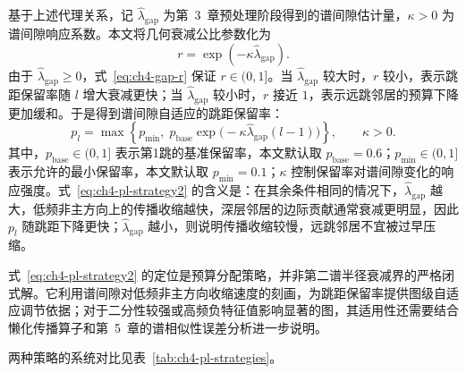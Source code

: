 基于上述代理关系，记 \(\hat{\lambda}_{\mathrm{gap}}\) 为第~3~章预处理阶段得到的谱间隙估计量，\(\kappa>0\) 为谱间隙响应系数。本文将几何衰减公比参数化为
\begin{equation}
  r=\exp(-\kappa\hat{\lambda}_{\mathrm{gap}}).
  \label{eq:ch4-gap-r}
\end{equation}
由于 \(\hat{\lambda}_{\mathrm{gap}}\geq 0\)，式~\eqref{eq:ch4-gap-r} 保证 \(r\in(0,1]\)。当 \(\hat{\lambda}_{\mathrm{gap}}\) 较大时，\(r\) 较小，表示跳距保留率随 \(l\) 增大衰减更快；当 \(\hat{\lambda}_{\mathrm{gap}}\) 较小时，\(r\) 接近 \(1\)，表示远跳邻居的预算下降更加缓和。于是得到谱间隙自适应的跳距保留率：
\begin{equation}
  p_l = \max\!\left\{p_{\min},\;
  p_{\text{base}} \exp\!\bigl(-\kappa \hat{\lambda}_{\mathrm{gap}}(l-1)\bigr)
  \right\},
  \qquad \kappa > 0.
  \label{eq:ch4-pl-strategy2}
\end{equation}
其中，\(p_{\text{base}}\in(0,1]\) 表示第1跳的基准保留率，本文默认取
\(p_{\text{base}}=0.6\)；\(p_{\min}\in(0,1]\) 表示允许的最小保留率，本文默认取
\(p_{\min}=0.1\)；\(\kappa\) 控制保留率对谱间隙变化的响应强度。式~\eqref{eq:ch4-pl-strategy2} 的含义是：在其余条件相同的情况下，\(\hat{\lambda}_{\mathrm{gap}}\) 越大，低频非主方向上的传播收缩越快，深层邻居的边际贡献通常衰减更明显，因此 \(p_l\) 随跳距下降更快；\(\hat{\lambda}_{\mathrm{gap}}\) 越小，则说明传播收缩较慢，远跳邻居不宜被过早压缩。

式~\eqref{eq:ch4-pl-strategy2} 的定位是预算分配策略，并非第二谱半径衰减界的严格闭式解。它利用谱间隙对低频非主方向收缩速度的刻画，为跳距保留率提供图级自适应调节依据；对于二分性较强或高频负特征值影响显著的图，其适用性还需要结合懒化传播算子和第~5~章的谱相似性误差分析进一步说明。

两种策略的系统对比见表~\ref{tab:ch4-pl-strategies}。

